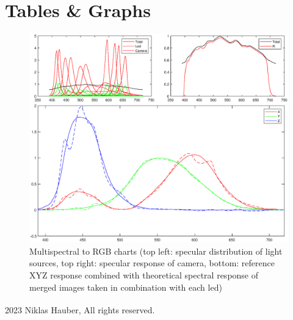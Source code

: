 \documentclass[11pt, twoside, listof=totocnumbered, bibliography=totocnumbered]{scrartcl}
\begin{document}
\section{Tables \& Graphs}
\begin{figure}[h!]
	\begin{center} 
		\includegraphics[width=1\linewidth]{chart.eps}
		\caption{Multispectral to RGB charts (top left: specular distribution of light sources, top right: specular response of camera, bottom: reference XYZ response combined with theoretical spectral response of merged images taken in combination with each led)} 
		\label{Figure 1}
	\end{center} 
\end{figure} 
\newpage

\vspace*{\fill}
\textsuperscript{\textcopyright} 2023 Niklas Hauber, All rights reserved.
\end{document}
